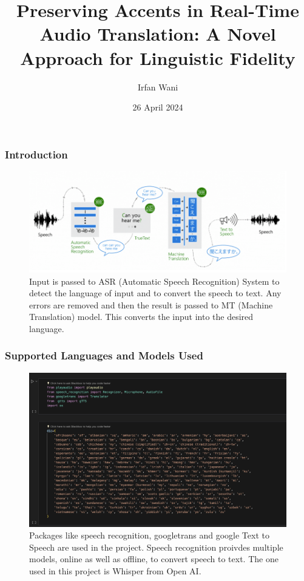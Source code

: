 \documentclass[12px]{beamer}
\title{Preserving Accents in Real-Time Audio Translation: A Novel Approach for Linguistic Fidelity}
\author{Irfan Wani}
\institute{Lovely Professional University}
\date{26 April 2024}
\begin{document}
\centering
\frame{\titlepage}
\begin{frame}
\frametitle{Introduction}
\begin{figure}
    \includegraphics[width=\textwidth]{audiotrans.png}
    \caption{Input is passed to ASR (Automatic Speech Recognition) System to detect the language of input and to convert the speech to text. Any errors are removed and then the result is passed to MT (Machine Translation) model. This converts the input into the desired language.}
\end{figure}
\end{frame}

\begin{frame}
\frametitle{Supported Languages and Models Used}
\begin{figure}
    \includegraphics[width=\textwidth]{packagesandlangs.png}
    \caption{Packages like speech recognition, googletrans and google Text to Speech are used in the project. Speech recognition proivdes multiple models, online as well as offline, to convert speech to text. The one used in this project is Whisper from Open AI.}
\end{figure}
\end{frame}
\end{document}

